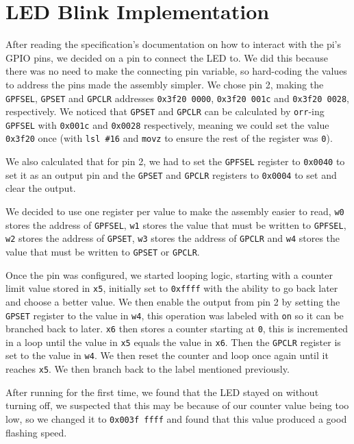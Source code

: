 \documentclass[11pt]{article}
\begin{document}
\section{LED Blink Implementation}

After reading the specification's documentation on how to interact with the pi's GPIO pins, we decided on a pin to connect the LED to. We did this because there was no need to make the connecting pin variable, so hard-coding the values to address the pins made the assembly simpler. We chose pin 2, making the \texttt{GPFSEL}, \texttt{GPSET} and \texttt{GPCLR} addresses \texttt{0x3f20 0000}, \texttt{0x3f20 001c} and \texttt{0x3f20 0028}, respectively. We noticed that \texttt{GPSET} and \texttt{GPCLR} can be calculated by \texttt{orr}-ing  \texttt{GPFSEL} with \texttt{0x001c} and \texttt{0x0028} respectively, meaning we could set the value \texttt{0x3f20} once (with \texttt{lsl \#16} and \texttt{movz} to ensure the rest of the register was \texttt{0}).

We also calculated that for pin 2, we had to set the \texttt{GPFSEL} register to \texttt{0x0040} to set it as an output pin and the \texttt{GPSET} and \texttt{GPCLR} registers to \texttt{0x0004} to set and clear the output.

We decided to use one register per value to make the assembly easier to read, \texttt{w0} stores the address of \texttt{GPFSEL}, \texttt{w1} stores the value that must be written to \texttt{GPFSEL}, \texttt{w2} stores the address of \texttt{GPSET}, \texttt{w3} stores the address of \texttt{GPCLR} and \texttt{w4} stores the value that must be written to \texttt{GPSET} or \texttt{GPCLR}.

Once the pin was configured, we started looping logic, starting with a counter limit value stored in \texttt{x5}, initially set to \texttt{0xffff} with the ability to go back later and choose a better value. We then enable the output from pin 2 by setting the \texttt{GPSET} register to the value in \texttt{w4}, this operation was labeled with \texttt{on} so it can be branched back to later. \texttt{x6} then stores a counter starting at \texttt{0}, this is incremented in a loop until the value in \texttt{x5} equals the value in \texttt{x6}. Then the \texttt{GPCLR} register is set to the value in \texttt{w4}. We then reset the counter and loop once again until it reaches \texttt{x5}. We then branch back to the label mentioned previously.

After running for the first time, we found that the LED stayed on without turning off, we suspected that this may be because of our counter value being too low, so we changed it to \texttt{0x003f ffff} and found that this value produced a good flashing speed.
\end{document}
